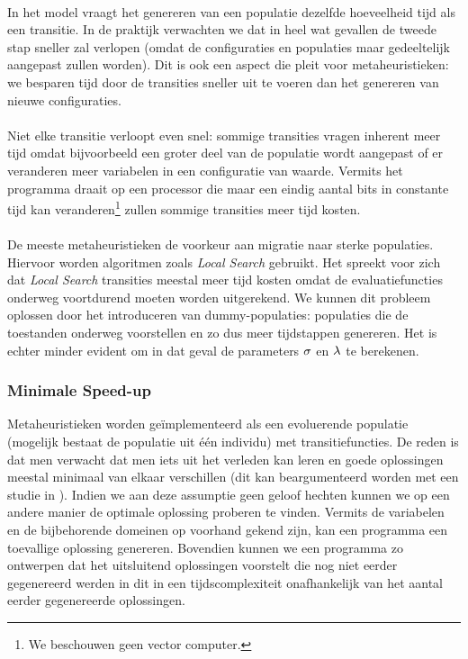 \paragraph{}
In het model vraagt het genereren van een populatie dezelfde hoeveelheid tijd als een transitie. In de praktijk verwachten we dat in heel wat gevallen de tweede stap sneller zal verlopen (omdat de configuraties en populaties maar gedeeltelijk aangepast zullen worden). Dit is ook een aspect die pleit voor metaheuristieken: we besparen tijd door de transities sneller uit te voeren dan het genereren van nieuwe configuraties.

\paragraph{}
Niet elke transitie verloopt even snel: sommige transities vragen inherent meer tijd omdat bijvoorbeeld een groter deel van de populatie wordt aangepast of er veranderen meer variabelen in een configuratie van waarde. Vermits het programma draait op een processor die maar een eindig aantal bits in constante tijd kan veranderen\footnote{We beschouwen geen vector computer.} zullen sommige transities meer tijd kosten.

\paragraph{}
De meeste metaheuristieken de voorkeur aan migratie naar sterke populaties. Hiervoor worden algoritmen zoals \emph{Local Search} gebruikt. Het spreekt voor zich dat \emph{Local Search} transities meestal meer tijd kosten omdat de evaluatiefuncties onderweg voortdurend moeten worden uitgerekend. We kunnen dit probleem oplossen door het introduceren van dummy-populaties: populaties die de toestanden onderweg voorstellen en zo dus meer tijdstappen genereren. Het is echter minder evident om in dat geval de parameters $\sigma$ en $\lambda$ te berekenen.

\subsubsection{Minimale Speed-up}

Metaheuristieken worden ge\"implementeerd als een evoluerende populatie (mogelijk bestaat de populatie uit \'e\'en individu) met transitiefuncties. De reden is dat men verwacht dat men iets uit het verleden kan leren en goede oplossingen meestal minimaal van elkaar verschillen (dit kan beargumenteerd worden met een studie in \cite{Kalnis02viewselection}). Indien we aan deze assumptie geen geloof hechten kunnen we op een andere manier de optimale oplossing proberen te vinden\cite{DBLP:journals/jc/ShonkwilerV94}. Vermits de variabelen en de bijbehorende domeinen op voorhand gekend zijn, kan een programma een toevallige oplossing genereren. Bovendien kunnen we een programma zo ontwerpen dat het uitsluitend oplossingen voorstelt die nog niet eerder gegenereerd werden in dit in een tijdscomplexiteit onafhankelijk van het aantal eerder gegenereerde oplossingen.
